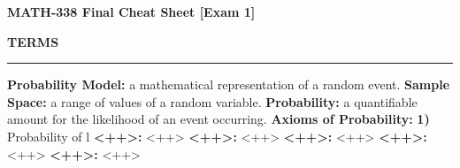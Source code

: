 \documentclass[6pt]{article}
\begin{document}
\begin{footnotesize}

\begin{center}
\textbf{MATH-338 Final Cheat Sheet [Exam 1]}
\end{center}

\textbf{TERMS}

\par\noindent\rule{\textwidth}{0.4pt}

\textbf{Probability Model:} a mathematical representation of a random event. 
\textbf{Sample Space:} a range of values of a random variable. 
\textbf{Probability:} a quantifiable amount for the likelihood of an event occurring. 
\textbf{Axioms of Probability:} \textbf{1)} Probability of l
\textbf{<++>:} <++>
\textbf{<++>:} <++>
\textbf{<++>:} <++>
\textbf{<++>:} <++>
\textbf{<++>:} <++>










\end{footnotesize}
\end{document}
